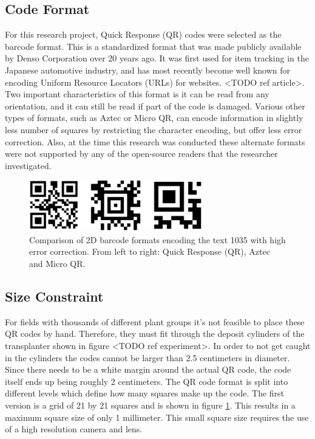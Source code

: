 \subsection{Code Format}
\label{section:code_format}

For this research project, Quick Response (QR) codes were selected as the barcode format. This is a standardized format that was made publicly available by Denso Corporation over 20 years ago.  It was first used for item tracking in the Japanese automotive industry, and has most recently become well known for encoding Uniform Resource Locators (URLs) for websites. <TODO ref article>.  Two important characteristics of this format is it can be read from any orientation, and it can still be read if part of the code is damaged.  Various other types of formats, such as Aztec or Micro QR, can encode information in slightly less number of squares by restricting the character encoding, but offer less error correction.  Also, at the time this research was conducted these alternate formats were not supported by any of the open-source readers that the researcher investigated. 

\begin{figure}[htb]
	\centering
    \includegraphics[width=3in]{figures/generated_codes_1035.png}
    \caption[2D barcode formats]{Comparison of 2D barcode formats encoding the text 1035 with high error correction.  From left to right: Quick Response (QR), Aztec and Micro QR.}
    \label{barcode_formats}
\end{figure} 

\subsection{Size Constraint}

For fields with thousands of different plant groups it's not feasible to place these QR codes by hand.  Therefore, they must fit through the deposit cylinders of the transplanter shown in figure <TODO ref experiment>.  In order to not get caught in the cylinders the codes cannot be larger than 2.5 centimeters in diameter. Since there needs to be a white margin around the actual QR code, the code itself ends up being roughly 2 centimeters.  The QR code format is split into different levels which define how many squares make up the code.  The first version is a grid of 21 by 21 squares and is shown in figure \ref{barcode_formats}.  This results in a maximum square size of only 1 millimeter.  This small square size requires the use of a high resolution camera and lens.  

